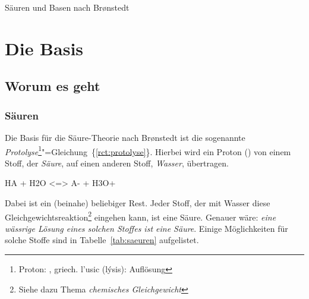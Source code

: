 \documentclass{scrartcl}
\newcommand*\rctref[1]{\{\ref{#1}\}}
\begin{document}
\begin{center}
  \Huge\sffamily Säuren und Basen nach Br\o nstedt
\end{center}
\begin{multicols}{2}
  \tableofcontents
\end{multicols}

\section{Die Basis}
\subsection{Worum es geht}
\subsubsection{Säuren}
Die Basis für die Säure-Theorie nach Br\o nstedt ist die sogenannte
\emph{Protolyse}\footnote{Proton: \Hpl, griech. \textgreek{l'usic} (l\'ysis):
  Auflösung}"=Gleichung~\rctref{rct:protolyse}.  Hierbei wird ein Proton
(\Hpl) von einem Stoff, der \emph{Säure}, auf einen anderen Stoff,
\emph{Wasser}, übertragen.
\begin{reaction}
  HA + H2O <=> A- + H3O+ \label{rct:protolyse}
\end{reaction}
Dabei ist  ein (beinahe) beliebiger Rest.  Jeder Stoff, der mit Wasser
diese Gleichgewichtsreaktion\footnote{Siehe dazu Thema \emph{chemisches
  Gleichgewicht}} eingehen kann, ist eine Säure.  Genauer wäre: \emph{eine
wässrige Lösung eines solchen Stoffes ist eine Säure}.  Einige Möglichkeiten
für solche Stoffe sind in Tabelle~\ref{tab:saeuren} aufgelistet.
\end{document}
